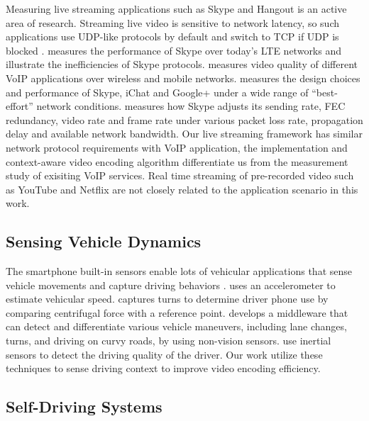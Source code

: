 Measuring live streaming applications such as Skype and Hangout
is an active area of research. 
Streaming live video is sensitive to network latency,
so such applications use UDP-like protocols by default
and switch to TCP if UDP is 
blocked \cite{yu2014can, xu2012video, zhang2012profiling}.
\cite{li2017measurement} measures the performance of Skype 
over today's LTE networks and illustrate the inefficiencies of Skype protocols.
\cite{yu2014can} measures video quality of different 
VoIP applications over wireless and mobile networks. 
\cite{xu2012video} measures the design choices and 
performance of Skype, iChat and Google+ 
under a wide range of ``best-effort'' network conditions.
\cite{zhang2012profiling} measures how Skype adjusts its sending rate, FEC redundancy,
video rate and frame rate under various packet loss rate, 
propagation delay and available network bandwidth.
Our live streaming framework has similar network protocol
requirements with VoIP application, 
the implementation and context-aware video encoding algorithm
differentiate us from the measurement study of exisiting
VoIP services. 
Real time streaming of pre-recorded video such as YouTube and Netflix \cite{rao2011network}
are not closely related to the application scenario in this work. 


\subsection{Sensing Vehicle Dynamics}

The smartphone built-in sensors enable lots of vehicular applications
that sense vehicle movements and capture driving behaviors 
\cite{hansenspeed, wang2013sensing, chen2015invisible, uber, cmtelematics}. 
\cite{hansenspeed} uses an accelerometer to estimate vehicular speed. 
\cite{wang2013sensing} captures turns to determine driver phone
use by comparing centrifugal force with a reference point. 
\cite{chen2015invisible} develops a middleware that can detect 
and differentiate various vehicle maneuvers, 
including lane changes, turns, and driving on curvy roads,
by using non-vision sensors.
\cite{singh2013using, fazeen2012safe} use inertial sensors to detect the driving quality of the
driver.
Our work utilize these techniques to sense driving context 
to improve video encoding efficiency.  

 
\subsection{Self-Driving Systems}

